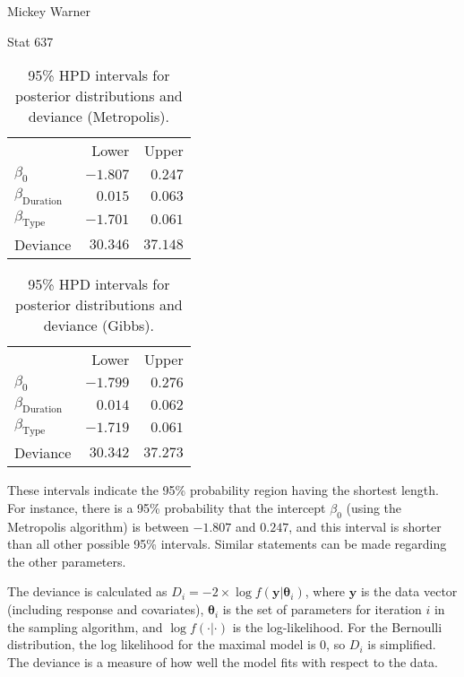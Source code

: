 \documentclass[12pt]{article}
\newcommand{\m}[1]{\mathbf{\bm{#1}}}
\begin{document}
\noindent Mickey Warner

\noindent Stat 637

\begin{table}[h]
\begin{center}
\begin{tabular}{lrr}
 & & \\ \hline
 & Lower & Upper \\ \hline \hline
$\beta_0$                   & $-1.807$ & $ 0.247$ \\
$\beta_{\mathrm{Duration}}$ & $ 0.015$ & $ 0.063$ \\
$\beta_{\mathrm{Type}}$     & $-1.701$ & $ 0.061$ \\
Deviance                    & $30.346$ & $37.148$ \\ \hline
\end{tabular}
\caption{95\% HPD intervals for posterior distributions and deviance (Metropolis).}
\end{center}
\end{table}

\begin{table}[h]
\begin{center}
\begin{tabular}{lrr}
 & & \\ \hline
 & Lower & Upper \\ \hline \hline
$\beta_0$                   & $-1.799$ & $ 0.276$ \\
$\beta_{\mathrm{Duration}}$ & $ 0.014$ & $ 0.062$ \\
$\beta_{\mathrm{Type}}$     & $-1.719$ & $ 0.061$ \\
Deviance                    & $30.342$ & $37.273$ \\ \hline
\end{tabular}
\caption{95\% HPD intervals for posterior distributions and deviance (Gibbs).}
\end{center}
\end{table}

\noindent These intervals indicate the 95\% probability region having the shortest length. For instance, there is a 95\% probability that the intercept $\beta_0$ (using the Metropolis algorithm) is between $-1.807$ and $0.247$, and this interval is shorter than all other possible 95\% intervals. Similar statements can be made regarding the other parameters.
\bigskip

\noindent The deviance is calculated as $D_i = -2\times\log f(\m{y}|\m{\theta}_i)$, where $\m{y}$ is the data vector (including response and covariates), $\m{\theta}_i$ is the set of parameters for iteration $i$ in the sampling algorithm, and $\log f(\cdot|\cdot)$ is the log-likelihood. For the Bernoulli distribution, the log likelihood for the maximal model is $0$, so $D_i$ is simplified. The deviance is a measure of how well the model fits with respect to the data.
\bigskip
\end{document}
